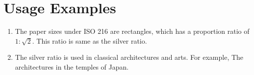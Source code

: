 \section{Usage Examples}
\begin{enumerate}
  \item The paper sizes under ISO 216 are rectangles, which has a proportion ratio of \( 1:\sqrt{2} \). This ratio is same as the silver ratio.
  \item The silver ratio is used in classical architectures and arts. For example, The architectures in the temples of Japan. \\
\end{enumerate}